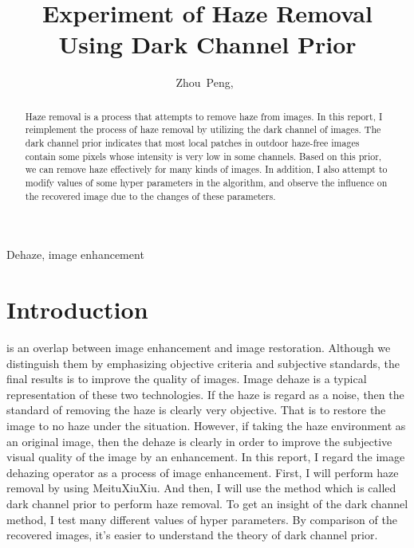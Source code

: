 \documentclass[journal,comsoc]{IEEEtran}
\begin{document}
\title{Experiment of Haze Removal Using Dark Channel Prior}
\author{Zhou~Peng,~}
\maketitle

\begin{abstract}
  
  Haze removal is a process that attempts to remove haze from images. In this report,
  I reimplement the process of haze removal by utilizing the dark channel of images.
  The dark channel prior indicates that most local patches in outdoor haze-free images
  contain some pixels whose intensity is very low in some channels. Based on this prior,
  we can remove haze effectively for many kinds of images. In addition, I also attempt
  to modify values of some hyper parameters in the algorithm, and observe the influence
  on the recovered image due to the changes of these parameters.
\end{abstract}

\begin{IEEEkeywords}
Dehaze, image enhancement
\end{IEEEkeywords}

\section{Introduction}
 is an overlap between image enhancement and image restoration. Although
we distinguish them by emphasizing objective criteria and subjective standards, the final results
is to improve the quality of images. Image dehaze is a typical representation of these two technologies.
If the haze is regard as a noise, then the standard of removing the haze is clearly very objective.
That is to restore the image to no haze under the situation. However, if taking the haze environment
as an original image, then the dehaze is clearly in order to improve the subjective visual quality
of the image by an enhancement. In this report, I regard the image dehazing operator as a process of
image enhancement. First, I will perform haze removal by using MeituXiuXiu. And then, I will use the
method which is called dark channel prior\cite{dark-channel} to perform haze removal. To get an
insight of the dark channel method, I test many different values of hyper parameters. By comparison
of the recovered images, it's easier to understand the theory of dark channel prior.
\end{document}
